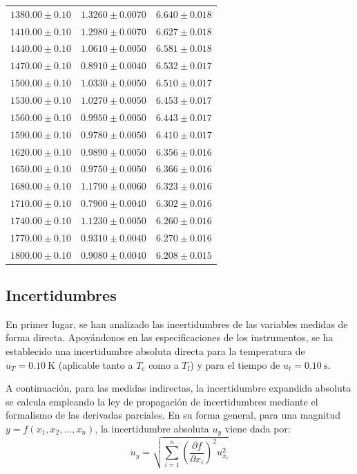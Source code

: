 \documentclass[a4paper,11pt]{article}
\begin{document}
\begin{longtable}{r c c}
$1380.00 \pm 0.10$ & $1.3260 \pm 0.0070$ & $6.640 \pm 0.018$ \\
$1410.00 \pm 0.10$ & $1.2980 \pm 0.0070$ & $6.627 \pm 0.018$ \\
$1440.00 \pm 0.10$ & $1.0610 \pm 0.0050$ & $6.581 \pm 0.018$ \\
$1470.00 \pm 0.10$ & $0.8910 \pm 0.0040$ & $6.532 \pm 0.017$ \\
$1500.00 \pm 0.10$ & $1.0330 \pm 0.0050$ & $6.510 \pm 0.017$ \\
$1530.00 \pm 0.10$ & $1.0270 \pm 0.0050$ & $6.453 \pm 0.017$ \\
$1560.00 \pm 0.10$ & $0.9950 \pm 0.0050$ & $6.443 \pm 0.017$ \\
$1590.00 \pm 0.10$ & $0.9780 \pm 0.0050$ & $6.410 \pm 0.017$ \\
$1620.00 \pm 0.10$ & $0.9890 \pm 0.0050$ & $6.356 \pm 0.016$ \\
$1650.00 \pm 0.10$ & $0.9750 \pm 0.0050$ & $6.366 \pm 0.016$ \\
$1680.00 \pm 0.10$ & $1.1790 \pm 0.0060$ & $6.323 \pm 0.016$ \\
$1710.00 \pm 0.10$ & $0.7900 \pm 0.0040$ & $6.302 \pm 0.016$ \\
$1740.00 \pm 0.10$ & $1.1230 \pm 0.0050$ & $6.260 \pm 0.016$ \\
$1770.00 \pm 0.10$ & $0.9310 \pm 0.0040$ & $6.270 \pm 0.016$ \\
$1800.00 \pm 0.10$ & $0.9080 \pm 0.0040$ & $6.208 \pm 0.015$ \\
\end{longtable}

\subsection{Incertidumbres}
En primer lugar, se han analizado las incertidumbres de las variables medidas de forma directa. Apoyándonos en las especificaciones de los instrumentos, se ha establecido una incertidumbre absoluta directa para la temperatura de $u_T = \SI{0.10}{\kelvin}$ (aplicable tanto a $T_{\mathrm{c}}$ como a $T_{\mathrm{f}}$) y para el tiempo de $u_t = \SI{0.10}{\second}$.

A continuación, para las medidas indirectas, la incertidumbre expandida absoluta se calcula empleando la ley de propagación de incertidumbres mediante el formalismo de las derivadas parciales. En su forma general, para una magnitud $y = f(x_1, x_2, \dots, x_n)$, la incertidumbre absoluta $u_y$ viene dada por:
\begin{equation}
u_y = \sqrt{\sum_{i=1}^{n} \left( \frac{\partial f}{\partial x_i} \right)^2 u_{x_i}^2}
\label{eq:unc_general_base}
\end{equation}
\end{document}
